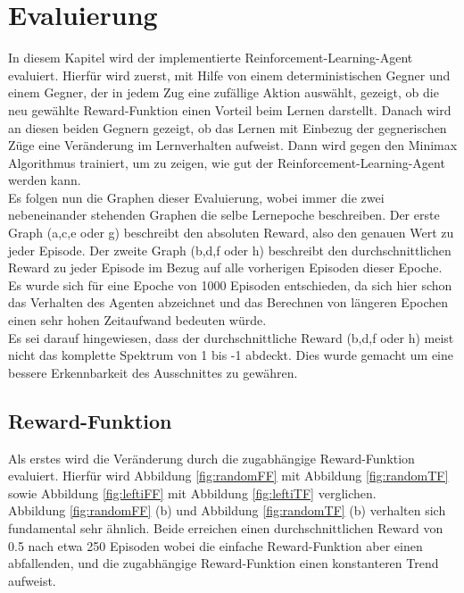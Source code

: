 \chapter{Evaluierung}%

\label{cha:Eval}

In diesem Kapitel wird der implementierte Reinforcement-Learning-Agent evaluiert. Hierfür wird zuerst, mit Hilfe von einem deterministischen Gegner und einem Gegner, der in jedem Zug eine zufällige Aktion auswählt, gezeigt, ob die neu gewählte Reward-Funktion einen Vorteil beim Lernen darstellt. Danach wird an diesen beiden Gegnern gezeigt, ob das Lernen mit Einbezug der gegnerischen Züge eine Veränderung im Lernverhalten aufweist. Dann wird gegen den Minimax Algorithmus trainiert, um zu zeigen, wie gut der Reinforcement-Learning-Agent werden kann. \\Es folgen nun die Graphen dieser Evaluierung, wobei immer die zwei nebeneinander stehenden Graphen die selbe Lernepoche beschreiben. Der erste Graph (a,c,e oder g) beschreibt den absoluten Reward, also den genauen Wert zu jeder Episode. Der zweite Graph (b,d,f oder h) beschreibt den durchschnittlichen Reward zu jeder Episode im Bezug auf alle vorherigen Episoden dieser Epoche.
Es wurde sich für eine Epoche von 1000 Episoden entschieden, da sich hier schon das Verhalten des Agenten abzeichnet und das Berechnen von längeren Epochen einen sehr hohen Zeitaufwand bedeuten würde.\\

Es sei darauf hingewiesen, dass der durchschnittliche Reward (b,d,f oder h) meist nicht das komplette Spektrum von 1 bis -1 abdeckt. Dies wurde gemacht um eine bessere Erkennbarkeit des Ausschnittes zu gewähren.

\section{Reward-Funktion}
Als erstes wird die Veränderung durch die zugabhängige Reward-Funktion evaluiert. Hierfür wird Abbildung \ref{fig:randomFF} mit Abbildung \ref{fig:randomTF} sowie Abbildung \ref{fig:leftiFF} mit Abbildung \ref{fig:leftiTF} verglichen.\\
Abbildung \ref{fig:randomFF} (b) und Abbildung \ref{fig:randomTF} (b) verhalten sich fundamental sehr ähnlich. Beide erreichen einen durchschnittlichen Reward von 0.5 nach etwa 250 Episoden wobei die einfache Reward-Funktion aber einen abfallenden, und die zugabhängige Reward-Funktion einen konstanteren Trend aufweist.\\

